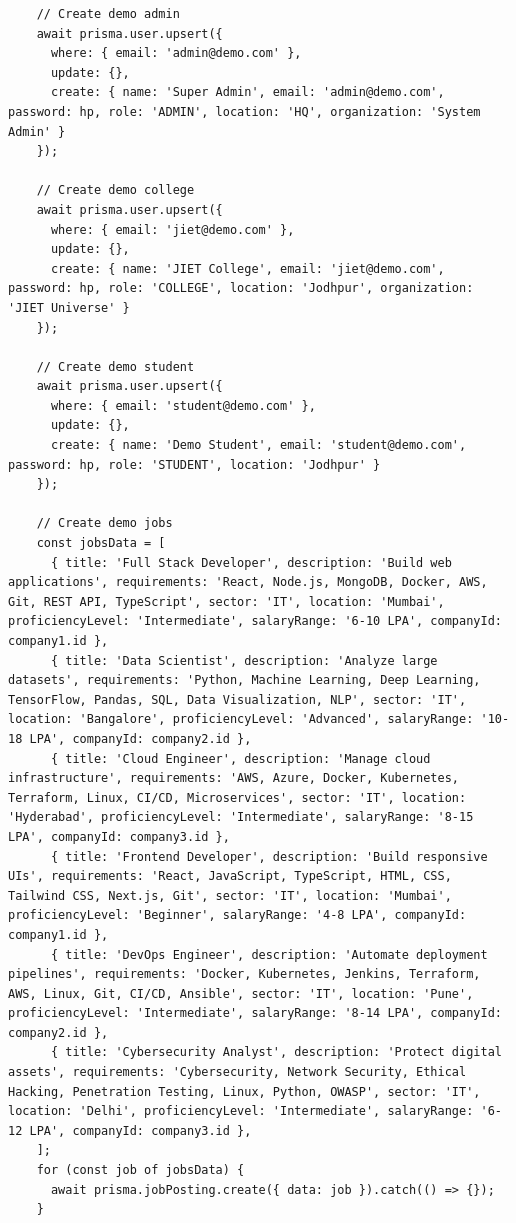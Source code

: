 \documentclass[12pt,a4paper]{report}
\begin{document}
\begin{verbatim}
    // Create demo admin
    await prisma.user.upsert({
      where: { email: 'admin@demo.com' },
      update: {},
      create: { name: 'Super Admin', email: 'admin@demo.com', password: hp, role: 'ADMIN', location: 'HQ', organization: 'System Admin' }
    });

    // Create demo college
    await prisma.user.upsert({
      where: { email: 'jiet@demo.com' },
      update: {},
      create: { name: 'JIET College', email: 'jiet@demo.com', password: hp, role: 'COLLEGE', location: 'Jodhpur', organization: 'JIET Universe' }
    });

    // Create demo student
    await prisma.user.upsert({
      where: { email: 'student@demo.com' },
      update: {},
      create: { name: 'Demo Student', email: 'student@demo.com', password: hp, role: 'STUDENT', location: 'Jodhpur' }
    });

    // Create demo jobs
    const jobsData = [
      { title: 'Full Stack Developer', description: 'Build web applications', requirements: 'React, Node.js, MongoDB, Docker, AWS, Git, REST API, TypeScript', sector: 'IT', location: 'Mumbai', proficiencyLevel: 'Intermediate', salaryRange: '6-10 LPA', companyId: company1.id },
      { title: 'Data Scientist', description: 'Analyze large datasets', requirements: 'Python, Machine Learning, Deep Learning, TensorFlow, Pandas, SQL, Data Visualization, NLP', sector: 'IT', location: 'Bangalore', proficiencyLevel: 'Advanced', salaryRange: '10-18 LPA', companyId: company2.id },
      { title: 'Cloud Engineer', description: 'Manage cloud infrastructure', requirements: 'AWS, Azure, Docker, Kubernetes, Terraform, Linux, CI/CD, Microservices', sector: 'IT', location: 'Hyderabad', proficiencyLevel: 'Intermediate', salaryRange: '8-15 LPA', companyId: company3.id },
      { title: 'Frontend Developer', description: 'Build responsive UIs', requirements: 'React, JavaScript, TypeScript, HTML, CSS, Tailwind CSS, Next.js, Git', sector: 'IT', location: 'Mumbai', proficiencyLevel: 'Beginner', salaryRange: '4-8 LPA', companyId: company1.id },
      { title: 'DevOps Engineer', description: 'Automate deployment pipelines', requirements: 'Docker, Kubernetes, Jenkins, Terraform, AWS, Linux, Git, CI/CD, Ansible', sector: 'IT', location: 'Pune', proficiencyLevel: 'Intermediate', salaryRange: '8-14 LPA', companyId: company2.id },
      { title: 'Cybersecurity Analyst', description: 'Protect digital assets', requirements: 'Cybersecurity, Network Security, Ethical Hacking, Penetration Testing, Linux, Python, OWASP', sector: 'IT', location: 'Delhi', proficiencyLevel: 'Intermediate', salaryRange: '6-12 LPA', companyId: company3.id },
    ];
    for (const job of jobsData) {
      await prisma.jobPosting.create({ data: job }).catch(() => {});
    }


\end{verbatim}
\end{document}
